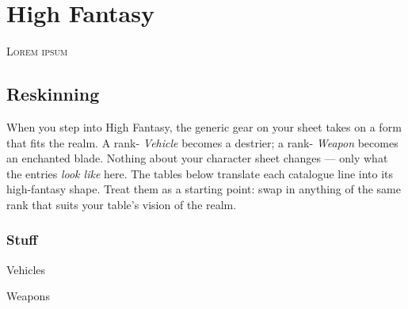 \renewcommand{\realmaccent}{realmFantasy}  %
\chapter{High Fantasy}

\begin{readaloud}
\lipsum[27][1-4]
\end{readaloud}


\lettrine{L}{orem ipsum} \lipsum[28]

\section{Reskinning}
When you step into High Fantasy, the generic gear on your sheet takes on a
form that fits the realm. A rank- \emph{Vehicle} becomes a
destrier; a rank- \emph{Weapon} becomes an enchanted blade. Nothing
about your character sheet changes --- only what the entries \emph{look
like} here. The tables below translate each catalogue line into its
high-fantasy shape. Treat them as a starting point: swap in anything of the
same rank that suits your table's vision of the realm.

\subsection{Stuff}
\begin{reskin}{Vehicles}
\end{reskin}
\begin{reskin}{Weapons}
\end{reskin}

